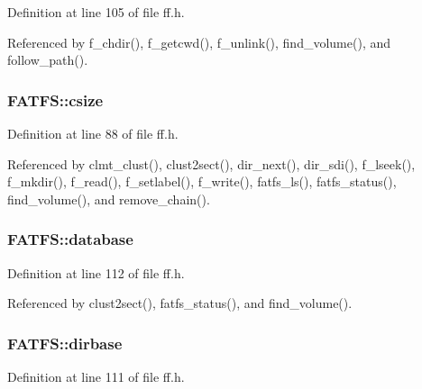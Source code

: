 Definition at line 105 of file ff.\+h.



Referenced by f\+\_\+chdir(), f\+\_\+getcwd(), f\+\_\+unlink(), find\+\_\+volume(), and follow\+\_\+path().

\subsubsection[{\texorpdfstring{csize}{csize}}]{ F\+A\+T\+F\+S\+::csize}\hypertarget{structFATFS_a504a1175f6dcc9a854b9da94463bd108}{}\label{structFATFS_a504a1175f6dcc9a854b9da94463bd108}


Definition at line 88 of file ff.\+h.



Referenced by clmt\+\_\+clust(), clust2sect(), dir\+\_\+next(), dir\+\_\+sdi(), f\+\_\+lseek(), f\+\_\+mkdir(), f\+\_\+read(), f\+\_\+setlabel(), f\+\_\+write(), fatfs\+\_\+ls(), fatfs\+\_\+status(), find\+\_\+volume(), and remove\+\_\+chain().

\subsubsection[{\texorpdfstring{database}{database}}]{ F\+A\+T\+F\+S\+::database}\hypertarget{structFATFS_a5b6c0bc2e9fd2ae8ef714210a74a2d5d}{}\label{structFATFS_a5b6c0bc2e9fd2ae8ef714210a74a2d5d}


Definition at line 112 of file ff.\+h.



Referenced by clust2sect(), fatfs\+\_\+status(), and find\+\_\+volume().

\subsubsection[{\texorpdfstring{dirbase}{dirbase}}]{ F\+A\+T\+F\+S\+::dirbase}\hypertarget{structFATFS_a3f72fd998dbcce4652a85a81fe944bc4}{}\label{structFATFS_a3f72fd998dbcce4652a85a81fe944bc4}


Definition at line 111 of file ff.\+h.



